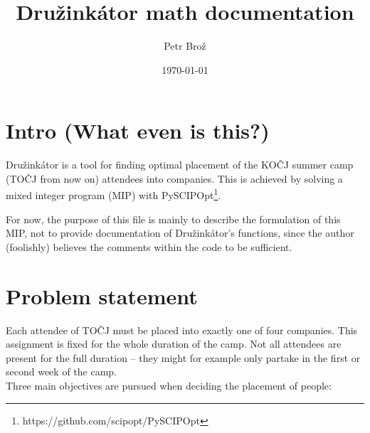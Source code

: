\documentclass[11pt]{article}
\title{Družinkátor math documentation}
\author{Petr Brož}
\date{\today}
\begin{document}
\maketitle	
\pagebreak



\section{Intro (What even is this?)}

Družinkátor is a tool for finding optimal placement of the KOČJ summer camp (TOČJ from now on) attendees into companies.
This is achieved by solving a mixed integer program (MIP) with PySCIPOpt\footnote{https://github.com/scipopt/PySCIPOpt}.

For now, the purpose of this file is mainly to describe the formulation of this MIP, not to provide documentation of Družinkátor's functions, since the 
author (foolishly) believes the comments within the code to be sufficient.

\section{Problem statement}

Each attendee of TOČJ must be placed into exactly one of four companies.  This assignment is fixed for the whole duration of the camp.  Not all attendees are
present for the full duration -- they might for example only partake in the first or second week of the camp. \\

Three main objectives are pursued when deciding the placement of people:
\end{document}
